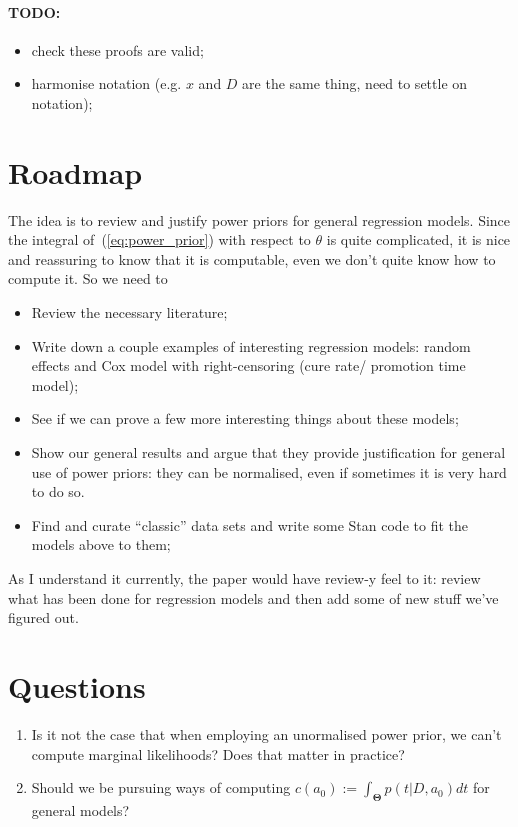\documentclass[a4paper, notitlepage, 11pt]{article}
\begin{document}
\paragraph{TODO:}
\begin{itemize}
 \item check these proofs are valid;
 \item harmonise notation (e.g. $x$ and $D$ are the same thing, need to settle on notation);
\end{itemize}

\section{Roadmap}
The idea is to review and justify power priors for general regression models.
Since the integral of~(\ref{eq:power_prior}) with respect to $\theta$ is quite complicated, it is nice and reassuring to know that it is computable, even we don't quite know how to compute it.
So we need to
\begin{itemize}
 \item Review the necessary literature;
 \item Write down a couple examples of interesting regression models: random effects and Cox model with right-censoring (cure rate/ promotion time model);
 \item See if we can prove a few more interesting things about these models;
 \item Show our general results and argue that they provide justification for general use of power priors: they can be normalised, even if sometimes it is very hard to do so.
 \item Find and curate ``classic'' data sets and write some Stan code to fit the models above to them;
\end{itemize}
As I understand it currently, the paper would have review-y feel to it: review what has been done for regression models and then add some of new stuff we've figured out.

\section{Questions}

\begin{enumerate}
 \item Is it not the case that when employing an unormalised power prior, we can't compute marginal likelihoods? Does that matter in practice?
 \item Should we be pursuing ways of computing $c(a_0) := \int_{\boldsymbol \Theta} p(t | D, a_0)dt$ for general models? 
\end{enumerate}
\end{document}
